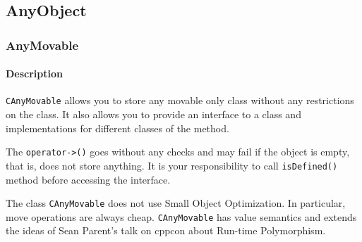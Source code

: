 \documentclass{article}
\begin{document}
\subsection{AnyObject}
\subsubsection{AnyMovable}\label{section::AnyMovable}

\paragraph{Description}
\verb"CAnyMovable" allows you to store any movable only class without any restrictions on the class. It also allows you to provide  an interface to a class and implementations for different classes of the method.

The \verb"operator->()" goes without any checks and may fail if the object is empty, that is, does not store anything. It is your responsibility to call \verb"isDefined()" method before accessing the interface.

The class \verb"CAnyMovable" does not use Small Object Optimization. In particular, move operations are always cheap. \verb"CAnyMovable" has value semantics and extends the ideas of Sean Parent's talk on cppcon about Run-time Polymorphism.
\end{document}
